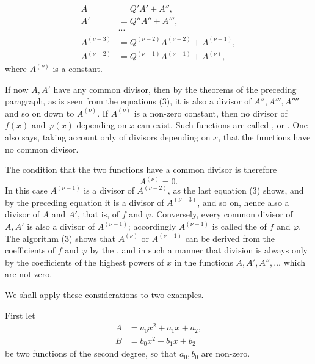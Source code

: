 
\begin{equation}
\begin{aligned}
A&=Q'A'+A'',\\
A'&=Q''A''+A''',\\
&\cdots\\
A^{(\nu-3)}&=Q^{(\nu-2)}A^{(\nu-2)}+A^{(\nu-1)},\\
A^{(\nu-2)}&=Q^{(\nu-1)}A^{(\nu-1)}+A^{(\nu)},
\end{aligned}
\tag{3}
\end{equation}
where $A^{(\nu)}$ is a constant.

If now $A,A'$ have any common divisor, then by the theorems of the preceding paragraph, as is seen from the equations (3), it is also a divisor of $A'',A''',A''''$ and so on down to $A^{(\nu)}$. If $A^{(\nu)}$ is a non-zero constant, then no divisor of $f(x)$ and $\varphi(x)$ depending on $x$ can exist. Such functions are called , or . One also says, taking account only of divisors depending on $x$, that the functions have no common divisor.

The condition that the two functions have a common divisor is therefore
\begin{equation}
 A^{(\nu)}=0.
\tag{4}
\end{equation}
In this case $A^{(\nu-1)}$ is a divisor of $A^{(\nu-2)}$, as the last equation (3) shows, and by the preceding equation it is a divisor of $A^{(\nu-3)}$, and so on, hence also a divisor of $A$ and $A'$, that is, of $f$ and $\varphi$. Conversely, every common divisor of $A,A'$ is also a divisor of $A^{(\nu-1)}$; accordingly $A^{(\nu-1)}$ is called the  of $f$ and $\varphi$. The algorithm (3) shows that $A^{(\nu)}$ or $A^{(\nu-1)}$ can be derived from the coefficients of $f$ and $\varphi$ by the , and in such a manner that division is always only by the coefficients of the highest powers of $x$ in the functions $A,A',A'',\ldots$ which are not zero.

We shall apply these considerations to two examples.

First let
\begin{equation}
\begin{aligned}
 A&=a_0x^2+a_1x+a_2,\\
 B&=b_0x^2+b_1x+b_2
\end{aligned}
\tag{5}
\end{equation}
be two functions of the second degree, so that $a_0,b_0$ are non-zero.
